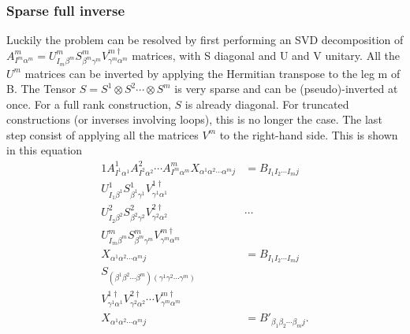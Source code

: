 \subsubsection{Sparse full inverse}

Luckily the problem can be resolved by first performing an SVD decomposition of $A^m_{ I^m \alpha^m } = U^m_{ I_m \beta^m } S^m_{\beta^m \gamma^m}  V^{m\dagger}_{\gamma^m \alpha^m}$ matrices, with S diagonal and U and V unitary. All the $U^m$ matrices can be inverted by applying the Hermitian transpose to the leg m of B. The Tensor $S = S^1 \otimes S^2 \cdots \otimes S^m$ is very sparse and can be (pseudo)-inverted at once. For a full rank construction, $S$  is already diagonal. For truncated constructions (or inverses involving loops), this is no longer the case.
The last step consist of applying all the matrices $V^m$ to the right-hand side. This is shown in this equation
\begin{alignat}{1}
    A^1_{ I^1 \alpha^1 }   A^2_{ I^2 \alpha^2 }  \cdots  A^m_{ I^m \alpha^m }   X_{ \alpha^1  \alpha^2  \cdots \alpha^m j } & =  B_{  I_1  I_2 \cdots I_m   j }               \\%
    U^1_{ I_1 \beta^1 } S^1_{\beta^1 \gamma^1}  V^{1\dagger}_{\gamma^1 \alpha^1}                                            & \nonumber                                       \\
    U^2_{ I_2 \beta^2 } S^2_{\beta^2 \gamma^2}  V^{2\dagger}_{\gamma^2 \alpha^2}                                            & \cdots  \nonumber                               \\
    U^m_{ I_m \beta^m } S^m_{\beta^m \gamma^m}  V^{m\dagger}_{\gamma^m \alpha^m}                                            & \nonumber                                       \\
    X_{ \alpha^1  \alpha^2  \cdots \alpha^m j }                                                                             & =  B_{  I_1  I_2 \cdots I_m   j }               \\ %
    S_{ (\beta^1 \beta^2 \cdots \beta^m) (\gamma^1  \gamma^2 \cdots \gamma^m)  }                                            & \nonumber                                       \\
    V^{1\dagger}_{\gamma^1 \alpha^1}   V^{2\dagger}_{\gamma^2 \alpha^2}  \cdots  V^{m\dagger}_{\gamma^m \alpha^m}           & \nonumber                                       \\
    X_{ \alpha^1  \alpha^2  \cdots \alpha^m j }                                                                             & =  B'_{  \beta_1  \beta_2 \cdots \beta_m   j }.
\end{alignat}

